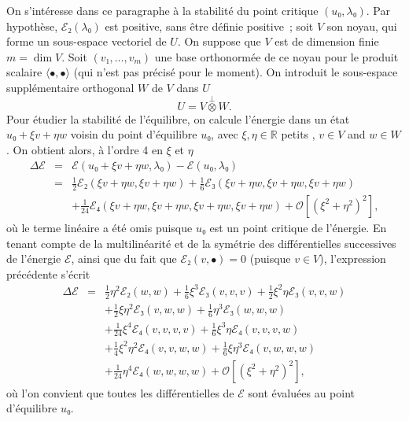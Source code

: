 \documentclass[12pt, final]{amsart}
\theoremstyle{definition}
\begin{document}
On s'intéresse dans ce paragraphe à la stabilité du point critique
$(u₀, λ₀) .$ Par hypothèse, $ℰ₂ (λ₀)$ est
positive, sans être définie positive~; soit $V$ son noyau, qui forme
un sous-espace vectoriel de $U$. On suppose que $V$ est de dimension finie $m
= \dim V$. Soit $(v₁, \ldots, v_m)$ une base orthonormée de ce noyau pour
le produit scalaire $〈 •, • 〉$ (qui n'est pas
précisé pour le moment). On introduit le sous-espace
supplémentaire orthogonal $W$ de $V$ dans $U$
\begin{equation}
  U = V \overset{\perp}{\otimes} W.
\end{equation}
Pour étudier la stabilité de l'équilibre, on calcule l'énergie
dans un état $u₀ + ξ v + η w$ voisin du point d'équilibre $u₀$,
avec $ξ, η∈\mathbb{R}$ {\guillemotleft} petits {\guillemotright}, $v
\in V$ and $w∈W$. On obtient alors, à l'ordre 4 en $ξ$ et $η$
\begin{eqnarray}
  \Delta ℰ & = & ℰ (u₀ + ξ v + η w, λ₀)
  -ℰ (u₀, λ₀) \nonumber\\
  & = & \tfrac{1}{2} ℰ₂ (ξ v + η w, ξ v + η w) +
  \tfrac{1}{6} ℰ₃ (ξ v + η w, ξ v + η w, ξ v + η w)
  \nonumber\\
  &  &  + \tfrac{1}{24} ℰ₄ (ξ v + η w, ξ v + η
  w, ξ v + η w, ξ v + η w) +\mathcal{O} [(ξ^2 + η^2)^2],
\end{eqnarray}
où le terme linéaire a été omis puisque $u₀$ est un point
critique de l'énergie. En tenant compte de la multilinéarité et de
la symétrie des différentielles successives de l'énergie
$ℰ$, ainsi que du fait que $ℰ₂ (v, •) = 0$ (puisque
$v∈V$), l'expression précédente s'écrit
\begin{eqnarray}
  \Delta ℰ & = & \tfrac{1}{2} η^2 ℰ₂ (w, w) +
  \tfrac{1}{6} ξ^3 ℰ₃ (v, v, v) + \tfrac{1}{2} ξ^2 η
  ℰ₃ (v, v, w) \nonumber\\
  &  & + \tfrac{1}{2} ξ η^2 ℰ₃ (v, w, w) + \tfrac{1}{6}
  η^3 ℰ₃ (w, w, w) \nonumber\\
  &  & + \tfrac{1}{24} ξ^4 ℰ₄ (v, v, v, v) + \tfrac{1}{6} ξ^3
  η ℰ₄ (v, v, v, w) \nonumber\\
  &  & + \tfrac{1}{4} ξ^2 η^2 ℰ₄ (v, v, w, w) + \tfrac{1}{6}
  ξ η^3 ℰ₄ (v, w, w, w) \nonumber\\
  &  & + \tfrac{1}{24} η^4 ℰ₄ (w, w, w, w) +\mathcal{O} [(ξ^2
  + η^2)^2],
\end{eqnarray}
où l'on convient que toutes les différentielles de $ℰ$ sont
évaluées au point d'équilibre $u₀$.
\end{document}

